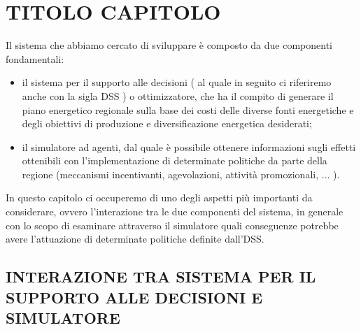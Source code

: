 \documentclass[12pt,a4paper,openright,twoside]{report}
\begin{document}
\chapter{TITOLO CAPITOLO}

Il sistema che abbiamo cercato di sviluppare è composto da due componenti fondamentali: \begin{itemize}
	\item il sistema per il supporto alle decisioni ( al quale in seguito ci riferiremo anche con la sigla DSS ) o ottimizzatore, che ha il compito di generare il piano energetico regionale sulla base dei costi delle diverse fonti energetiche e degli obiettivi di produzione e diversificazione energetica desiderati;
	\item il simulatore ad agenti, dal quale è possibile ottenere informazioni sugli effetti ottenibili con l'implementazione di determinate politiche da parte della regione (meccanismi incentivanti, agevolazioni, attività promozionali, ... ).
\end{itemize}
In questo capitolo ci occuperemo di uno degli aspetti più importanti da considerare, ovvero l'interazione tra le due componenti del sistema, in generale con lo scopo di esaminare attraverso il simulatore quali conseguenze potrebbe avere l'attuazione di determinate politiche  definite dall'DSS. 

\section[INTERAZIONE DSS E SIMULATORE]{INTERAZIONE TRA SISTEMA PER IL SUPPORTO ALLE DECISIONI E SIMULATORE}
\end{document}
